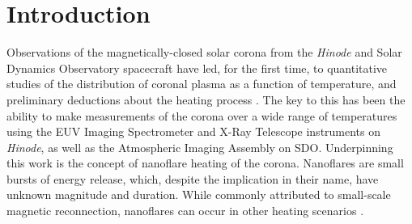 \section{Introduction}\label{hot-plasma:sec:intro}

Observations of the magnetically-closed solar corona from the \textit{Hinode} \citep{kosugi_hinode_2007} and Solar Dynamics Observatory \citep[SDO,][]{pesnell_solar_2012} spacecraft have led, for the first time, to quantitative studies of the distribution of coronal plasma as a function of temperature, and preliminary deductions about the heating process \citep[see papers in][]{de_moortel_recent_2015}. The key to this has been the ability to make measurements of the corona over a wide range of temperatures using the EUV Imaging Spectrometer \citep[EIS,][]{culhane_euv_2007} and X-Ray Telescope \citep[XRT,][]{golub_x-ray_2007} instruments on \textit{Hinode}, as well as the Atmospheric Imaging Assembly \citep[AIA,][]{lemen_atmospheric_2012} on SDO. Underpinning this work is the concept of nanoflare heating of the corona. Nanoflares \citep[e.g.][see \autoref{sec:nanoflares}]{parker_nanoflares_1988} are small bursts of energy release, which, despite the implication in their name, have unknown magnitude and duration. While commonly attributed to small-scale magnetic reconnection, nanoflares can occur in other heating scenarios \citep[e.g.][]{ofman_self-consistent_1998}.

